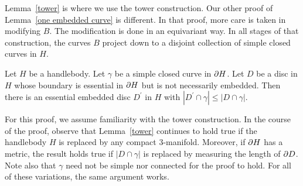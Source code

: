 Lemma~\ref{tower} is where we use the tower construction.  Our other proof of Lemma~\ref{one embedded curve} is different.  In that proof, more care is taken in modifying $B$.  The modification is done in an equivariant way.  In all stages of that construction, the curves $B$ project down to a disjoint collection of simple closed curves in $H$.

\begin{lemma}
\label{tower}
Let $H$ be a handlebody.  Let $\gamma$ be a simple closed curve in $\partial H$.  Let $D$ be a disc in $H$ whose boundary is essential in $\partial H$ but is not necessarily embedded.  Then there is an essential embedded disc $D^{\prime}$ in $H$ with $|D^{\prime}\cap\gamma|\leq|D\cap\gamma|$.
\end{lemma}

For this proof, we assume familiarity with the tower construction.  In the course of the proof, observe that Lemma~\ref{tower} continues to hold true if the handlebody $H$ is replaced by any compact 3-manifold.  Moreover, if $\partial H$ has a metric, the result holds true if $|D\cap\gamma|$ is replaced by measuring the length of $\partial D$.  Note also that $\gamma$ need not be simple nor connected for the proof to hold.  For all of these variations, the same argument works.

